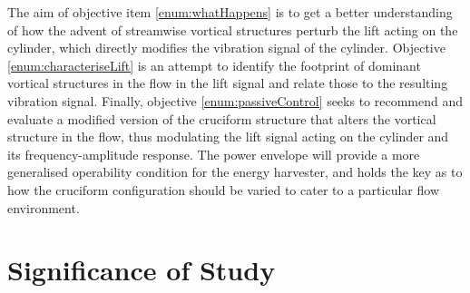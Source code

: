 \documentclass[oneside]{utmthesis}
\begin{document}
The aim of objective item \ref{enum:whatHappens} is to get a better understanding of how the advent of streamwise vortical structures perturb the lift acting on the cylinder, which directly modifies the vibration signal of the cylinder. Objective \ref{enum:characteriseLift} is an attempt to identify the footprint of dominant vortical structures in the flow in the lift signal and relate those to the resulting vibration signal. Finally, objective \ref{enum:passiveControl} seeks to recommend and evaluate a modified version of the cruciform structure that alters the vortical structure in the flow, thus modulating the lift signal acting on the cylinder and its frequency-amplitude response. The power envelope will provide a more generalised operability condition for the energy harvester, and holds the key as to how the cruciform configuration should be varied to cater to a particular flow environment.

\section{Significance of Study}


\end{document}
